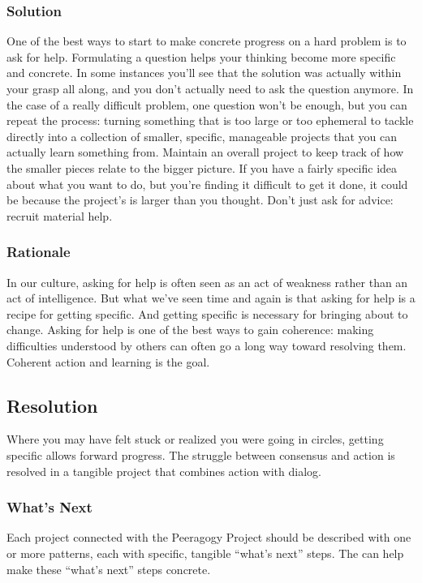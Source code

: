 \subsubsection*{Solution} 
One of the best ways to start to make concrete progress on a hard problem is to ask for help.   Formulating a question helps your thinking become more specific and concrete.  In some instances you'll see that the solution was actually within your grasp all along, and you don't actually need to ask the question anymore.  In the case of a really difficult problem, one question won't be enough, but you can repeat the process: turning something that is too large or too ephemeral to tackle directly into a collection of smaller, specific, manageable projects that you can actually learn something from.  Maintain an overall project  to keep track of how the smaller pieces relate to the bigger picture.  If you have a fairly specific idea about what you want to do, but you're finding it difficult to get it done, it could be because the project's  is larger than you thought.  Don't just ask for advice: recruit material help.

\subsubsection*{Rationale} 
In our culture, asking for help is often seen as an act of weakness rather than an act of intelligence.
But what we've seen time and again is that asking for help is a recipe for getting specific.
And getting specific is necessary for bringing about to change.  Asking for help is one
of the best ways to gain coherence: making difficulties understood by others can often go a long way
toward resolving them.  Coherent action and learning is the goal.

\subsection{Resolution}
Where you may have felt stuck or realized you were going in circles, getting specific allows forward progress.  The struggle between consensus and action is resolved in a tangible project that combines action with dialog.

\subsubsection*{What's Next}  Each project connected with the Peeragogy Project should be described with one or more patterns, each with specific, tangible ``what's next'' steps. The  can help make these ``what's next'' steps concrete. 

\endgroup
    
    
  